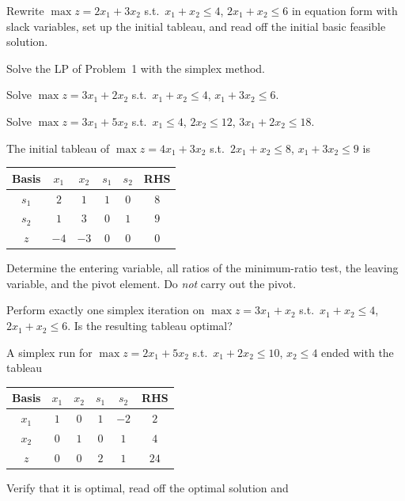 \begin{problems}
  \item Rewrite $\max z=2x_1+3x_2$ s.t.\ $x_1+x_2\le 4$, $2x_1+x_2\le 6$
        in equation form with slack variables, set up the initial tableau,
        and read off the initial basic feasible solution.
  \item Solve the LP of Problem~1 with the simplex method.
  \item Solve $\max z=3x_1+2x_2$ s.t.\ $x_1+x_2\le 4$, $x_1+3x_2\le 6$.
  \item Solve $\max z=3x_1+5x_2$ s.t.\ $x_1\le 4$, $2x_2\le 12$,
        $3x_1+2x_2\le 18$.
  \item The initial tableau of $\max z=4x_1+3x_2$ s.t.\ $2x_1+x_2\le 8$,
        $x_1+3x_2\le 9$ is
        \begin{center}
        \begin{tabular}{c|cccc|c}
        Basis & $x_1$ & $x_2$ & $s_1$ & $s_2$ & RHS\\
        \hline
        $s_1$ & $2$ & $1$ & $1$ & $0$ & $8$\\
        $s_2$ & $1$ & $3$ & $0$ & $1$ & $9$\\
        \hline
        $z$ & $-4$ & $-3$ & $0$ & $0$ & $0$\\
        \end{tabular}
        \end{center}
        Determine the entering variable, all ratios of the minimum-ratio
        test, the leaving variable, and the pivot element. Do \emph{not}
        carry out the pivot.
  \item Perform exactly one simplex iteration on $\max z=3x_1+x_2$ s.t.\
        $x_1+x_2\le 4$, $2x_1+x_2\le 6$. Is the resulting tableau optimal?
  \item A simplex run for $\max z=2x_1+5x_2$ s.t.\ $x_1+2x_2\le 10$,
        $x_2\le 4$ ended with the tableau
        \begin{center}
        \begin{tabular}{c|cccc|c}
        Basis & $x_1$ & $x_2$ & $s_1$ & $s_2$ & RHS\\
        \hline
        $x_1$ & $1$ & $0$ & $1$ & $-2$ & $2$\\
        $x_2$ & $0$ & $1$ & $0$ & $1$ & $4$\\
        \hline
        $z$ & $0$ & $0$ & $2$ & $1$ & $24$\\
        \end{tabular}
        \end{center}
        Verify that it is optimal, read off the optimal solution and

\end{problems}
